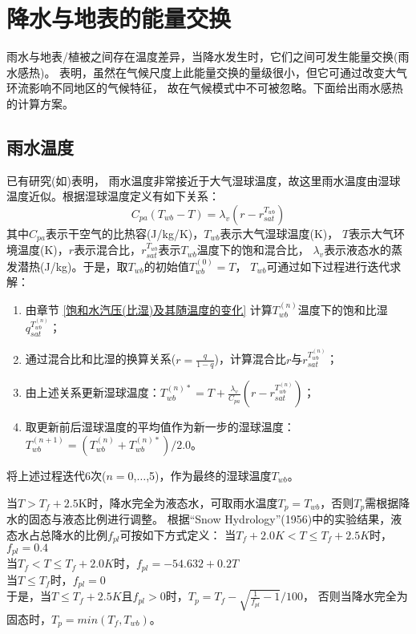 \chapter{降水与地表的能量交换}

雨水与地表/植被之间存在温度差异，当降水发生时，它们之间可发生能量交换(雨水感热)。
\citet{wei2014impact} 表明，虽然在气候尺度上此能量交换的量级很小，但它可通过改变大气环流影响不同地区的气候特征，
故在气候模式中不可被忽略。下面给出雨水感热的计算方案。

\section{雨水温度}\label{雨水温度}
已有研究(如\citet{anderson1998moored})表明，
雨水温度非常接近于大气湿球温度，故这里雨水温度由湿球温度近似。根据湿球温度定义有如下关系：
\begin{equation}
C_{p a}\left(T_{w b}-T\right)=\lambda_{v}\left(r-r_{s a t}^{T_{w b}}\right)
\end{equation}
其中$C_{pa}$表示干空气的比热容(J/kg/K)，$T_{wb}$表示大气湿球温度(K)，
$T$表示大气环境温度(K)，$r$表示混合比，$r_{sat}^{T_{wb}}$表示$T_{wb}$温度下的饱和混合比，
$\lambda_v$表示液态水的蒸发潜热(J/kg)。于是，取$T_{wb}$的初始值$T_{wb}^{\left(0\right)}=T$，
$T_{wb}$可通过如下过程进行迭代求解：
\begin{enumerate}
    \item 由章节 \ref{饱和水汽压(比湿)及其随温度的变化} 计算$T_{wb}^{\left(n\right)}$温度下的饱和比湿$q_{sat}^{T_{wb}^{\left(n\right)}}$；
    \item 通过混合比和比湿的换算关系($r=\frac{q}{1-q}$)，计算混合比$r$与$r_{sat}^{T_{wb}^{\left(n\right)}}$；
    \item 由上述关系更新湿球温度：$T_{wb}^{\left(n\right)\ast}=T+\frac{\lambda_v}{C_{pa}}\left(r-r_{sat}^{T_{wb}^{\left(n\right)}}\right)$；
    \item 取更新前后湿球温度的平均值作为新一步的湿球温度：$T_{wb}^{\left(n+1\right)}=\left(T_{wb}^{\left(n\right)}+T_{wb}^{\left(n\right)\ast}\right)/2.0$。
\end{enumerate}
将上述过程迭代6次($n=0$,$\ldots$,5)，作为最终的湿球温度$T_{wb}$。


当$T>T_f+2.5$K时，降水完全为液态水，可取雨水温度$T_p=T_{wb}$，否则$T_p$需根据降水的固态与液态比例进行调整。
根据“Snow Hydrology”(1956)中的实验结果，液态水占总降水的比例$f_{pl}$可按如下方式定义：
当$T_f+2.0K<T\le T_f+2.5K$时，$f_{pl}=0.4$ \\
当$T_f<T\le T_f+2.0K$时，$f_{pl}=-54.632+0.2T$ \\
当$T\le T_f$时，$f_{pl}=0$ \\
于是，当$T\le T_f+2.5K$且$f_{pl}>0$时，$T_p=T_f-\sqrt{\frac{1}{f_{pl}}-1}/100$，
否则当降水完全为固态时，$T_p=min{\left(T_f,T_{wb}\right)}$。


